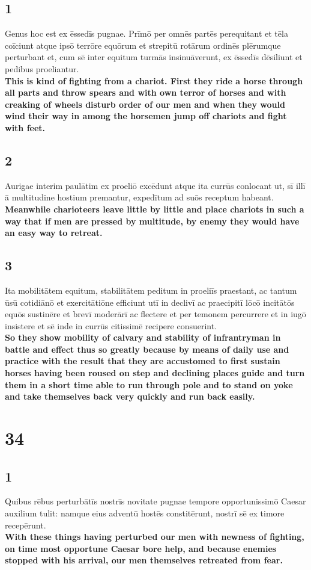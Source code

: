 \documentclass{article}
\begin{document}
\subsection*{1}
Genus hoc est ex ēssedīs pugnae. Prīmō per omnēs partēs perequitant et tēla coīciunt atque ipsō terrōre equōrum et strepitū rotārum ordinēs plērumque perturbant et, cum sē inter equitum turmās insinuāverunt, ex ēssedīs dēsiliunt et pedibus proeliantur. \\
\textbf{This is kind of fighting from a chariot. First they ride a horse through all parts and throw spears and with own terror of horses and with creaking of wheels disturb order of our men and when they would wind their way in among the horsemen jump off chariots and fight with feet.}

\subsection*{2}
Aurigae interim paulātim ex proeliō excēdunt atque ita currūs conlocant ut, sī illī ā multitudine hostium premantur, expedītum ad suōs receptum habeant. \\
\textbf{Meanwhile charioteers leave little by little and place chariots in such a way that if men are pressed by multitude, by enemy they would have an easy way to retreat.}

\subsection*{3}
Ita mobilitātem equitum, stabilitātem peditum in proeliīs praestant, ac tantum ūsū cotidiānō et exercitātiōne efficiunt utī in declivī ac praecipitī lōcō incitātōs equōs sustinēre et brevī moderārī ac flectere et per temonem percurrere et in iugō insistere et sē inde in currūs citissimē recipere consuerint.\\
\textbf{So they show mobility of calvary and stability of infrantryman in battle and effect thus so greatly because by means of daily use and practice with the result that they are accustomed to first sustain horses having been roused on step and declining places guide and turn them in a short time able to run through pole and to stand on yoke and take themselves back very quickly and run back easily. }


\section*{34}
\subsection*{1}
Quibus rēbus perturbātīs nostrīs novitate pugnae tempore opportunissimō Caesar auxilium tulit: namque eius adventū hostēs constitērunt, nostrī sē ex timore recepērunt. \\
\textbf{With these things having perturbed our men with newness of fighting, on time most opportune Caesar bore help, and because enemies stopped with his arrival, our men themselves retreated from fear.}
\end{document}
